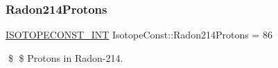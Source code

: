 \subsubsection{\texorpdfstring{Radon214\+Protons}{Radon214Protons}}
{\footnotesize\ttfamily \mbox{\hyperlink{group___isotope_const-_macros_ga5f18360b3e99483a35c32d789e62621c}{I\+S\+O\+T\+O\+P\+E\+C\+O\+N\+S\+T\+\_\+\+I\+NT}} Isotope\+Const\+::\+Radon214\+Protons = 86}

\$ \$ Protons in Radon-\/214. 